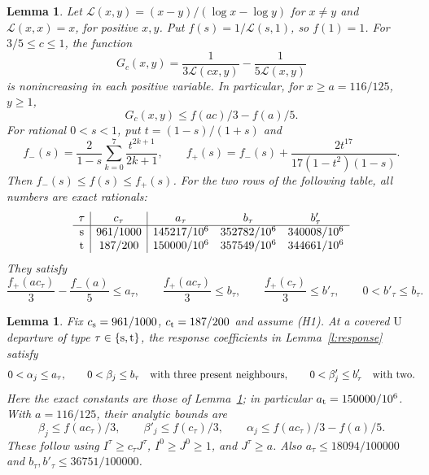 \documentclass[11pt,reqno]{amsart}
\newtheorem{lemma}[theorem]{Lemma}
\theoremstyle{definition}
\theoremstyle{remark}
\begin{document}
\begin{lemma}\label{l:log-mean-bounds}
Let \(\mathcal L(x,y)=(x-y)/(\log x-\log y)\) for \(x\ne y\)
and \(\mathcal L(x,x)=x\), for positive \(x,y\).
Put \(f(s)=1/\mathcal L(s,1)\), so \(f(1)=1\).
For \(3/5\le c\le1\), the function
\[
 G_c(x,y)=\frac1{3\mathcal L(cx,y)}-\frac1{5\mathcal L(x,y)}
\]
is nonincreasing in each positive variable. In particular,
for \(x\ge a=116/125\), \(y\ge1\),
\[
 G_c(x,y)\le f(ac)/3-f(a)/5.
\]
For rational \(0<s<1\), put \(t=(1-s)/(1+s)\) and
\[
 f_-(s)=\frac2{1-s}\sum_{k=0}^{7}\frac{t^{2k+1}}{2k+1},
 \qquad
 f_+(s)=f_-(s)+\frac{2t^{17}}{17(1-t^2)(1-s)}.
\]
Then \(f_-(s)\le f(s)\le f_+(s)\).
For the two rows of the following table, all numbers are exact rationals:
\[
 \begin{array}{c|c|ccc}
 \tau&c_\tau&a_\tau&b_\tau&b'_\tau\\ \hline
 {\rm s}&961/1000&145217/10^6&352782/10^6&340008/10^6\\
 {\rm t}&187/200&150000/10^6&357549/10^6&344661/10^6
 \end{array}
\]
They satisfy
\[
 \frac{f_+(ac_\tau)}3-\frac{f_-(a)}5\le a_\tau,\qquad
 \frac{f_+(ac_\tau)}3\le b_\tau,\qquad
 \frac{f_+(c_\tau)}3\le b'_\tau,\qquad
 0<b'_\tau\le b_\tau .
\]
\end{lemma}

\begin{lemma}\label{l:response-typed}
Fix \(c_{\rm s}=961/1000\), \(c_{\rm t}=187/200\) and assume (H1).
At a covered \(\mathrm U\) departure of type \(\tau\in\{{\rm s},{\rm t}\}\),
the response coefficients in Lemma~\ref{l:response} satisfy
\[
 0<\alpha_j\le a_\tau,\qquad 0<\beta_j\le b_\tau
       \quad\hbox{with three present neighbours},\qquad
 0<\beta'_j\le b'_\tau\quad\hbox{with two}.
\]
Here the exact constants are those of Lemma~\ref{l:log-mean-bounds};
in particular \(a_{\rm t}=150000/10^6\).
With \(a=116/125\), their analytic bounds are
\[
 \beta_j\le f(ac_\tau)/3,\qquad
 \beta'_j\le f(c_\tau)/3,\qquad
 \alpha_j\le f(ac_\tau)/3-f(a)/5.
\]
These follow using \(I^\tau\ge c_\tau J^\tau\),
\(I^0\ge J^0\ge1\), and \(J^\tau\ge a\).
Also \(a_\tau\le18094/100000\) and
\(b_\tau,b'_\tau\le36751/100000\).
\end{lemma}
\end{document}
